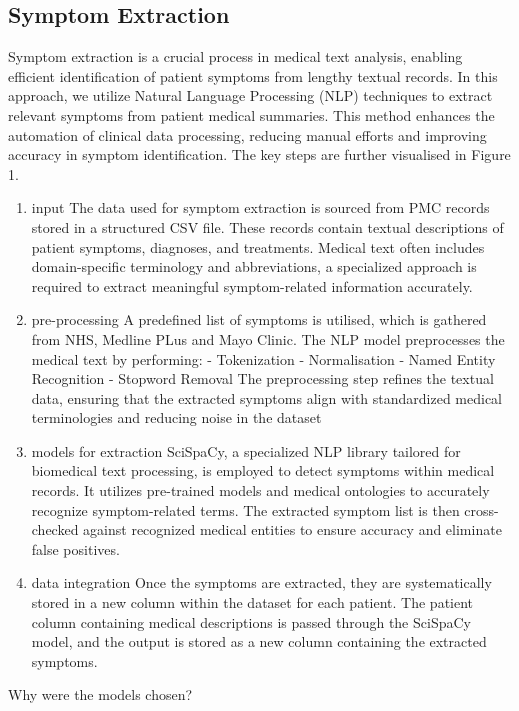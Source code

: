 \subsection{Symptom Extraction}
Symptom extraction is a crucial process in medical text analysis, enabling efficient identification of patient symptoms from lengthy textual records. In this approach, we utilize Natural Language Processing (NLP) techniques to extract relevant symptoms from patient medical summaries. This method enhances the automation of clinical data processing, reducing manual efforts and improving accuracy in symptom identification. The key steps are further visualised in Figure 1. 
\begin{enumerate}
    \item input
    The data used for symptom extraction is sourced from PMC records stored in a structured CSV file. These records contain textual descriptions of patient symptoms, diagnoses, and treatments. Medical text often includes domain-specific terminology and abbreviations, a specialized approach is required to extract meaningful symptom-related information accurately. 

    \item pre-processing
    A predefined list of symptoms is utilised, which is gathered from NHS, Medline PLus and Mayo Clinic.  The NLP model preprocesses the medical text by performing:
- Tokenization
- Normalisation
- Named Entity Recognition
- Stopword Removal
The preprocessing step refines the textual data, ensuring that the extracted symptoms align with standardized medical terminologies and reducing noise in the dataset 

    \item models for extraction
    SciSpaCy, a specialized NLP library tailored for biomedical text processing, is employed to detect symptoms within medical records. It utilizes pre-trained models and medical ontologies to accurately recognize symptom-related terms. The extracted symptom list is then cross-checked against recognized medical entities to ensure accuracy and eliminate false positives.


    \item data integration
    Once the symptoms are extracted, they are systematically stored in a new column within the dataset for each patient. The patient column containing medical descriptions is passed through the SciSpaCy model, and the output is stored as a new column containing the extracted symptoms.
\end{enumerate}
Why were the models chosen? 
